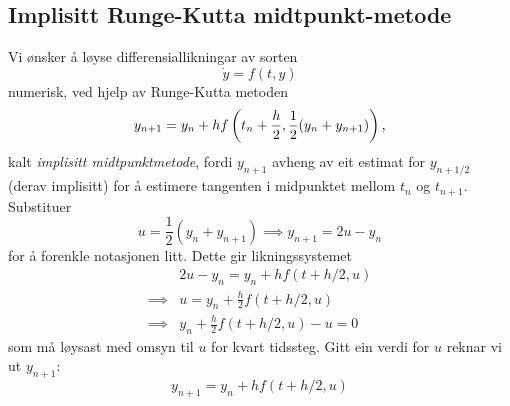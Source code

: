 \documentclass[12pt]{article}
\begin{document}
\begin{multicols*}{2}
    \subsection{Implisitt Runge-Kutta midtpunkt-metode}
    Vi ønsker å løyse differensiallikningar av sorten
    \[
        \dot y = f(t, y)
    \]
    numerisk, ved hjelp av Runge-Kutta metoden
    \begin{equation}
        y_{n + 1} = y_n + h f\left( t_n + \frac{h}{2}, \frac{1}{2}(y_n + y_{n + 1})\right) \text,
        \label{mpm}
    \end{equation}
    kalt {\em implisitt midtpunktmetode}, fordi $y_{n+1}$ avheng
    av eit estimat for $y_{n+1/2}$ (derav implisitt)
    for å estimere tangenten i midpunktet mellom $t_n$ og $t_{n+1}$.
    Substituer
    \[
        u = \frac 1 2 (y_n + y_{n + 1}) \implies y_{n+1} = 2u - y_n
    \]
    for å forenkle notasjonen litt.
    Dette gir likningssystemet
    \begin{align*}
                 & 2u - y_n = y_n + h f\left( t + h/2, u \right) \\
        \implies & u = y_n + \frac h 2 f\left( t+h/2, u \right) \\
        \implies & y_n + \frac h 2 f\left( t+h/2, u \right) - u = 0
    \end{align*}
    som må løysast med omsyn til $u$ for kvart tidssteg.
    Gitt ein verdi for $u$ reknar vi ut $y_{n+1}$:
    \begin{equation}
        y_{n+1} = y_n + h f(t + h/2, u)
    \end{equation}


\end{multicols*}
\end{document}
